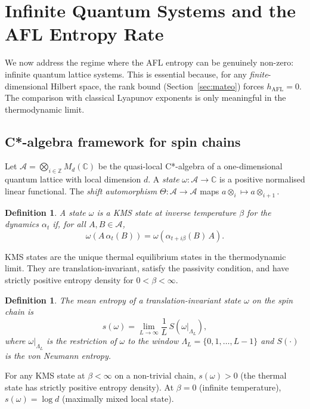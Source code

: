\documentclass[12pt,a4paper]{article}
\newtheorem{definition}[theorem]{Definition}
\begin{document}
\section{Infinite Quantum Systems and the AFL Entropy Rate}
\label{sec:infinite}

We now address the regime where the AFL entropy can be genuinely non-zero: infinite
quantum lattice systems.  This is essential because, for any \emph{finite}-dimensional
Hilbert space, the rank bound (Section~\ref{sec:mateo}) forces $h_{\mathrm{AFL}} = 0$.
The comparison with classical Lyapunov exponents is only meaningful in the
thermodynamic limit.

\subsection{C*-algebra framework for spin chains}

Let $\mathcal{A} = \bigotimes_{i \in \mathbb{Z}} M_d(\mathbb{C})$ be the quasi-local
C*-algebra of a one-dimensional quantum lattice with local dimension $d$.  A
\emph{state} $\omega : \mathcal{A} \to \mathbb{C}$ is a positive normalised linear
functional.  The \emph{shift automorphism} $\Theta : \mathcal{A} \to \mathcal{A}$ maps
$a \otimes_{i} \mapsto a \otimes_{i+1}$.

\begin{definition}
A state $\omega$ is a \emph{KMS state at inverse temperature $\beta$} for the dynamics
$\alpha_t$ if, for all $A, B \in \mathcal{A}$,
\[
  \omega(A \,\alpha_t(B)) = \omega(\alpha_{t+i\beta}(B)\, A).
\]
\end{definition}

KMS states are the unique thermal equilibrium states in the thermodynamic limit.  They
are translation-invariant, satisfy the passivity condition, and have strictly positive
entropy density for $0 < \beta < \infty$.

\begin{definition}
  The \emph{mean entropy} of a translation-invariant state $\omega$ on the spin chain is
  \[
    s(\omega) = \lim_{L \to \infty} \frac{1}{L}\, S(\omega|_{\Lambda_L}),
  \]
  where $\omega|_{\Lambda_L}$ is the restriction of $\omega$ to the window
  $\Lambda_L = \{0, 1, \dots, L-1\}$ and $S(\cdot)$ is the von Neumann entropy.
\end{definition}

For any KMS state at $\beta < \infty$ on a non-trivial chain, $s(\omega) > 0$
(the thermal state has strictly positive entropy density).  At $\beta = 0$ (infinite
temperature), $s(\omega) = \log d$ (maximally mixed local state).
\end{document}
